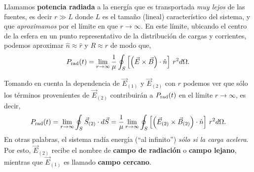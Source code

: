 Llamamos \textbf{potencia radiada} a la energía que es transportada \textit{muy lejos} de las fuentes, es decir $r\gg L$ donde $L$ es el tamaño (lineal) característico del sistema, y que \textit{aproximamos} por el límite en que $r\rightarrow\infty$. En este límite, ubicando el centro de la esfera en un punto representativo de la distribución de cargas y corrientes, podemos aproximar $\hat{n}\approx\hat{r}$ y $R\approx r$ de modo que,
\begin{equation}
P_{\rm rad} (t)=\lim_{r\rightarrow\infty}\frac{1}{\mu}\oint_S \left[ \left(
\vec{E}\times\vec{B}\right) \cdot \hat{n}\right] \,r^2 d\Omega.
\end{equation}

Tomando en cuenta la dependencia de $\vec{E}_{(1)}$ y $\vec{E}_{(2)}$ con $r$
podemos ver que sólo los términos provenientes de $\vec{E}_{(2)}$
contribuirán a $P_{\rm rad}(t)$ en el límite $r\rightarrow\infty$, es decir,
\begin{equation}\label{Pinf1}
P_{\rm rad}(t)=\lim_{r\rightarrow\infty}\oint_S \vec{S}_{(2)}\cdot
d\vec{S}=\frac{1}{\mu}\lim_{r\rightarrow\infty}\oint_S \left[ \left(
\vec{E}_{(2)}\times\vec{B}_{(2)}\right) \cdot \hat{n}\right] \,r^2 d\Omega.
\end{equation}
En otras palabras, el sistema radía energía (``al infinito'') \textit{sólo si la
carga acelera}. Por esto, $\vec{E}_{(2)}$ recibe el nombre de \textbf{campo de
radiación} o \textbf{campo lejano}, mientras que $\vec{E}_{(1)}$ es llamado
\textbf{campo cercano}.

